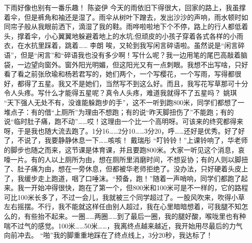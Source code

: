 {}下雨好像也别有一番乐趣！ \markdownRendererInterblockSeparator
{}\markdownRendererInterblockSeparator
{}陈姿伊\markdownRendererInterblockSeparator
{}今天的雨依旧下得很大，回家的路上，我虽撑着伞，但是裤角和袖还是湿了。雨伞从树叶下蹭去，发出沙沙的声响，雨水顿时如同帘子般从我眼前洒下，滴湿了我的鞋。雨哗啦啦地下个不停，路上的行人都低着头，撑着伞，小心翼翼地躲避着地上的水坑;但顽皮的小孩子穿着各式各样的小雨衣，在水抗里踩着，跳着……\markdownRendererInterblockSeparator
{}\markdownRendererInterblockSeparator
{}李朗\markdownRendererInterblockSeparator
{}唉，又轮到我写闲言碎语啦。虽然说是“闲言碎语”，但是“闲言”和“碎语我也没有多少啊！写什么呢？我一边用笔的尾巴高敲着脑袋，一边望向窗外。窗外阳光明媚，但这阳光又有一点刺眼。我想不出写啥，只好看了看之前张欣瑜和杨若君写的，她们两个，一个写樱花，一个写雨，写得都很好，都得了五星。我又不是她们，当然写不到这么好。而且，我写花写草那可十分令人头疼。写什么才能得五星呢？真令人头疼，难道我就得不了五星吗？\markdownRendererInterblockSeparator
{}\markdownRendererInterblockSeparator
{}姚琪\markdownRendererInterblockSeparator
{}“天下强人无处不有，没谁能躲跑步的手”，这不一听到跑800米，同学们都想了一堆点子：有的借“上厕所”为理由不想跑；有的说“昨天脚扭伤了”不能跑；有的说“临时肚子痛，跑不动”……哎！这理由一个比一个高明呀。可该来的终究都得来呀，于是我也随大流去跑了。1分16……2分10……3分20，呼……还好是优秀。好了好了，不说了，我要静静休息一下……咳咳！\markdownRendererInterblockSeparator
{}\markdownRendererInterblockSeparator
{}戴瑞彤\markdownRendererInterblockSeparator
{}“叮铃铃！”上课铃响了，华老师的脚步也随之而来，这节课是体育课，并且要跑800米。大家一听见这个消息，哀嚎一片。有的人以上厕所为由，想在厕所里消磨时间，不想妥协；有的人则以脚扭了、肚子痛为由，想在一旁休息，但都被华老师拒绝了。没办法，只好硬着头皮上了，我缓步走上跑道，咽了口唾沫。“预备，跑！”随着一声哨响，同学们都跑了起来。我一开始冲得很快，跑在了第一个，但800米和100米可是不一样的，它的路程可比100米长多了，不过一会儿，我就被三个同学超过了。一股风吹来，吹得小草左右摇摆。不行，我不能就这样任由别人超过，我在心里暗暗想着，可我腿不知怎么的，有些抬不起来。一圈……两圈……到了最后一圈，我的腿好酸，喉咙里也有种喘不过气的感觉。100米……50米……，我离终点越来越近，我开始用尽最后的力气向前冲去。\markdownRendererInterblockSeparator
{}“啪”我的脚重重地踩在了终点线上，3分20秒，我达标了！\markdownRendererInterblockSeparator
{}\markdownRendererInterblockSeparator
